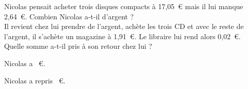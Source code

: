 Nicolas pensait acheter trois disques compacts à 17,05~\textgreek{\euro}
mais il lui manque 2,64~\textgreek{\euro}. Combien Nicolas a-t-il
d'argent ? \\Il revient chez lui prendre de l'argent, achète les trois CD
et avec le reste de l'argent, il s'achète un magazine à
1,91~\textgreek{\euro}. Le libraire lui rend alors
0,02~\textgreek{\euro}.\\Quelle somme a-t-il pris à son retour chez lui
?
\par\hspace{1cm}\kern1cm\kern2cm Nicolas a ~\textgreek{\euro}.
\par
{}\kern1cm\kern1cm\kern1cm Nicolas a repris ~\textgreek{\euro}.
